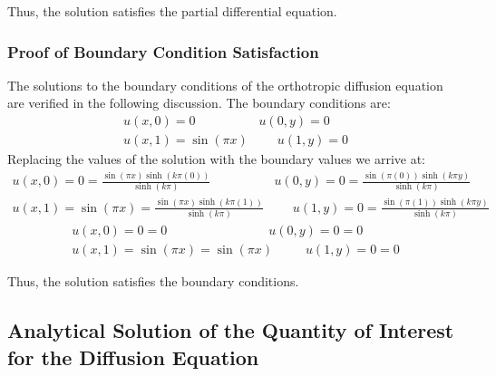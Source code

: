 \documentclass[10pt]{article}		%
\numberwithin{equation}{section}
\begin{document}
Thus, the solution satisfies the partial differential equation.

\subsubsection{Proof of Boundary Condition Satisfaction}

The solutions to the boundary conditions of the orthotropic diffusion equation are verified in the following discussion. The boundary conditions are:
\begin{equation}
\begin{split}
u(x, 0) = 0 \qquad \qquad \quad u(0, y) = 0  \\
u(x, 1) = \sin(\pi x) \qquad \; u(1, y) = 0
\end{split}
\end{equation}
Replacing the values of the solution with the boundary values we arrive at:
\begin{equation}
\begin{split}
u(x, 0) = 0 = \frac{\sin(\pi x) \sinh(k\pi (0))}{\sinh(k\pi)} \qquad \qquad \quad u(0, y) = 0 = \frac{\sin(\pi (0)) \sinh(k\pi y)}{\sinh(k\pi)}  \\
u(x, 1) = \sin(\pi x) = \frac{\sin(\pi x) \sinh(k\pi (1))}{\sinh(k\pi)} \qquad \; u(1, y) = 0 = \frac{\sin(\pi (1)) \sinh(k\pi y)}{\sinh(k\pi)}
\end{split}
\end{equation}
\begin{equation}
\begin{split}
u(x, 0) = 0 = 0 \qquad \qquad \qquad \qquad u(0, y) = 0 = 0  \\
u(x, 1) = \sin(\pi x) = \sin(\pi x) \qquad \; \; u(1, y) = 0 = 0
\end{split}
\end{equation}

Thus, the solution satisfies the boundary conditions.

\newpage

\subsection{Analytical Solution of the Quantity of Interest for the Diffusion Equation}
\end{document}

